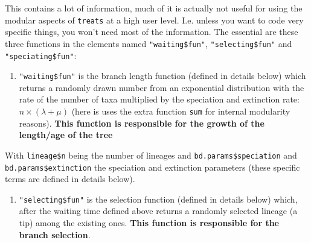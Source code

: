 \documentclass[
]{book}
\newenvironment{Shaded}{\begin{snugshade}}{\end{snugshade}}
\newcommand{\DecValTok}[1]{\textcolor[rgb]{0.00,0.00,0.81}{#1}}
\newcommand{\KeywordTok}[1]{\textcolor[rgb]{0.13,0.29,0.53}{\textbf{#1}}}
\newcommand{\NormalTok}[1]{#1}
\newcommand{\OperatorTok}[1]{\textcolor[rgb]{0.81,0.36,0.00}{\textbf{#1}}}
\newcommand{\StringTok}[1]{\textcolor[rgb]{0.31,0.60,0.02}{#1}}
\providecommand{\tightlist}{%
  \setlength{\itemsep}{0pt}\setlength{\parskip}{0pt}}
\begin{document}
This contains a lot of information, much of it is actually not useful for using the modular aspects of \texttt{treats} at a high user level. I.e. unless you want to code very specific things, you won't need most of the information. The essential are these three functions in the elements named \texttt{"waiting\$fun"}, \texttt{"selecting\$fun"} and \texttt{"speciating\$fun"}:

\begin{enumerate}
\def\labelenumi{\arabic{enumi}.}
\tightlist
\item
  \texttt{"waiting\$fun"} is the branch length function (defined in details below) which returns a randomly drawn number from an exponential distribution with the rate of the number of taxa multiplied by the speciation and extinction rate: \(n \times (\lambda + \mu)\) (here is uses the extra function \texttt{sum} for internal modularity reasons). \textbf{This function is responsible for the growth of the length/age of the tree}
\end{enumerate}

\begin{Shaded}
\end{Shaded}

With \texttt{lineage\$n} being the number of lineages and \texttt{bd.params\$speciation} and \texttt{bd.params\$extinction} the speciation and extinction parameters (these specific terms are defined in details below).

\begin{enumerate}
\def\labelenumi{\arabic{enumi}.}
\setcounter{enumi}{1}
\tightlist
\item
  \texttt{"selecting\$fun"} is the selection function (defined in details below) which, after the waiting time defined above returns a randomly selected lineage (a tip) among the existing ones. \textbf{This function is responsible for the branch selection}.
\end{enumerate}

\begin{Shaded}
\end{Shaded}
\end{document}
